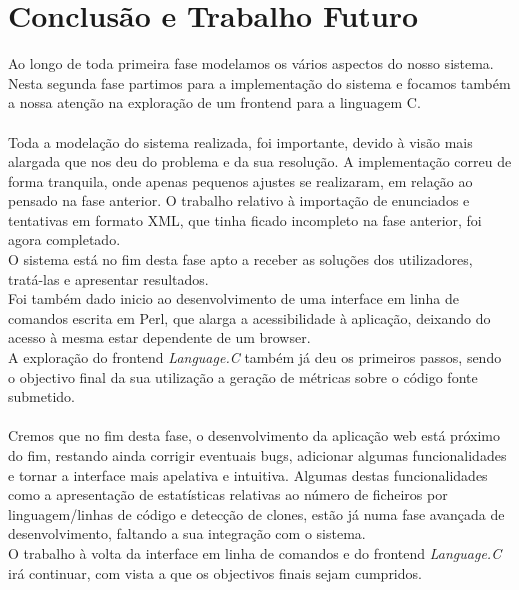\chapter{Conclusão e Trabalho Futuro}\label{chap con} 
Ao longo de toda primeira fase modelamos os vários aspectos do nosso sistema. Nesta segunda fase partimos para a implementação do
sistema e focamos também a nossa atenção na exploração de um frontend para a linguagem C.\\
\\
Toda a modelação do sistema realizada, foi importante, devido à visão mais alargada que nos deu do problema e da sua resolução.
A implementação correu de forma tranquila, onde apenas pequenos ajustes se realizaram, em relação ao pensado na fase anterior.
O trabalho relativo à importação de enunciados e tentativas em formato XML, que tinha ficado incompleto na fase anterior, foi agora 
completado.\\
O sistema está no fim desta fase apto a receber as soluções dos utilizadores, tratá-las e apresentar resultados.\\
Foi também dado inicio ao desenvolvimento de uma interface em linha de comandos escrita em Perl, que alarga a acessibilidade à
aplicação, deixando do acesso à mesma estar dependente de um browser.\\
A exploração do frontend \textit{Language.C} também já deu os primeiros passos, sendo o objectivo final da sua utilização a geração
de métricas sobre o código fonte submetido.\\
\\
Cremos que no fim desta fase, o desenvolvimento da aplicação web está próximo do fim, restando ainda corrigir eventuais bugs, adicionar
algumas funcionalidades e tornar a interface mais apelativa e intuitiva. Algumas destas funcionalidades como a apresentação
de estatísticas relativas ao número de ficheiros por linguagem/linhas de código  e detecção de clones, estão já numa fase avançada de
desenvolvimento, faltando a sua integração com o sistema.\\
O trabalho à volta da interface em linha de comandos e do frontend \textit{Language.C} irá continuar, com vista a que os objectivos finais
sejam cumpridos.

